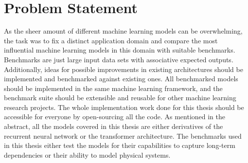 \documentclass[draft,final]{vutinfth} %
\begin{document}
    \section{Problem Statement}
    As the sheer amount of different machine learning models can be overwhelming, the task was to fix a distinct application domain and compare the most influential machine learning models in this domain with suitable benchmarks.
    Benchmarks are just large input data sets with associative expected outputs.
    Additionally, ideas for possible improvements in existing architectures should be implemented and benchmarked against existing ones.
    All benchmarked models should be implemented in the same machine learning framework, and the benchmark suite should be extensible and reusable for other machine learning research projects.
    The whole implementation work done for this thesis should be accessible for everyone by open-sourcing all the code.
    As mentioned in the abstract, all the models covered in this thesis are either derivatives of the recurrent neural network or the transformer \cite{Transformer} architecture.
    The benchmarks used in this thesis either test the models for their capabilities to capture long-term dependencies or their ability to model physical systems.
    
\end{document}
